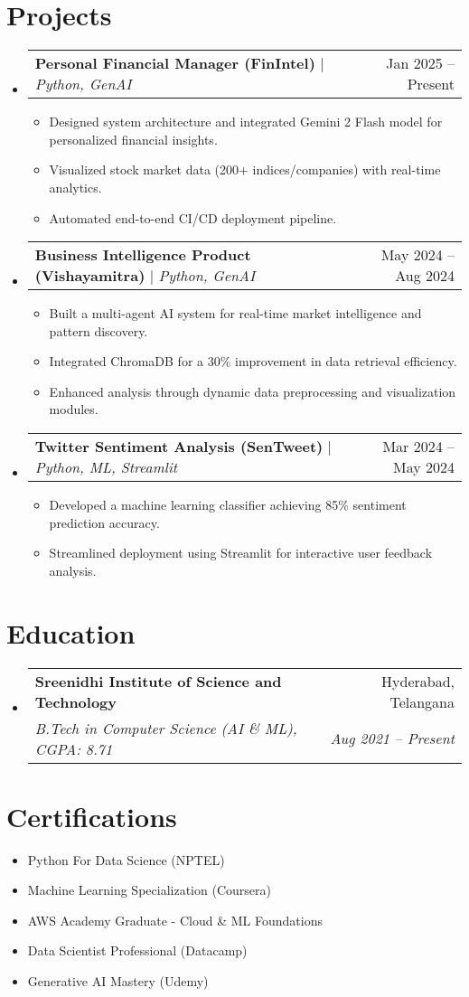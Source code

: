 \documentclass[letterpaper,11pt]{article}
\makeatletter
\newcommand{\resumeItem}[1]{
  \item\small{{#1 \vspace{-2pt}}}
}
\newcommand{\resumeSubheading}[4]{
  \vspace{-2pt}\item
    \begin{tabular*}{0.97\textwidth}[t]{l@{\extracolsep{\fill}}r}
      \textbf{#1} & #2 \\
      \textit{\small#3} & \textit{\small #4} \\
    \end{tabular*}\vspace{-7pt}
}
\newcommand{\resumeProjectHeading}[2]{
  \item
  \begin{tabular*}{0.97\textwidth}{l@{\extracolsep{\fill}}r}
    \small#1 & #2 \\
  \end{tabular*}\vspace{-7pt}
}
\newcommand{\resumeSubHeadingListStart}{\begin{itemize}[leftmargin=0.15in, label={}]}
\newcommand{\resumeSubHeadingListEnd}{\end{itemize}}
\newcommand{\resumeItemListStart}{\begin{itemize}}
\newcommand{\resumeItemListEnd}{\end{itemize}\vspace{-5pt}}
\makeatother
\begin{document}
\section{Projects}
  \resumeSubHeadingListStart
    \resumeProjectHeading
      {\textbf{Personal Financial Manager (FinIntel)} $|$ \emph{Python, GenAI}}{Jan 2025 -- Present}
      \resumeItemListStart
        \resumeItem{Designed system architecture and integrated Gemini 2 Flash model for personalized financial insights.}
        \resumeItem{Visualized stock market data (200+ indices/companies) with real-time analytics.}
        \resumeItem{Automated end-to-end CI/CD deployment pipeline.}
      \resumeItemListEnd
      
    \resumeProjectHeading
      {\textbf{Business Intelligence Product (Vishayamitra)} $|$ \emph{Python, GenAI}}{May 2024 -- Aug 2024}
      \resumeItemListStart
        \resumeItem{Built a multi-agent AI system for real-time market intelligence and pattern discovery.}
        \resumeItem{Integrated ChromaDB for a 30\% improvement in data retrieval efficiency.}
        \resumeItem{Enhanced analysis through dynamic data preprocessing and visualization modules.}
      \resumeItemListEnd

    \resumeProjectHeading
      {\textbf{Twitter Sentiment Analysis (SenTweet)} $|$ \emph{Python, ML, Streamlit}}{Mar 2024 -- May 2024}
      \resumeItemListStart
        \resumeItem{Developed a machine learning classifier achieving 85\% sentiment prediction accuracy.}
        \resumeItem{Streamlined deployment using Streamlit for interactive user feedback analysis.}
      \resumeItemListEnd
  \resumeSubHeadingListEnd

\section{Education}
  \resumeSubHeadingListStart
    \resumeSubheading
      {Sreenidhi Institute of Science and Technology}{Hyderabad, Telangana}
      {B.Tech in Computer Science (AI \& ML), CGPA: 8.71}{Aug 2021 -- Present}
  \resumeSubHeadingListEnd

\section{Certifications}
  \resumeSubHeadingListStart
    \resumeItem{Python For Data Science (NPTEL)}
    \resumeItem{Machine Learning Specialization (Coursera)}
    \resumeItem{AWS Academy Graduate - Cloud \& ML Foundations}
    \resumeItem{Data Scientist Professional (Datacamp)}
    \resumeItem{Generative AI Mastery (Udemy)}
  \resumeSubHeadingListEnd
\end{document}
